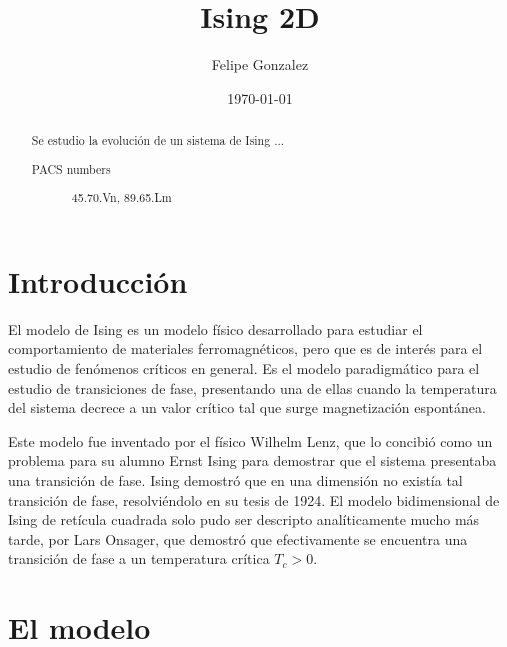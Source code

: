 \documentclass[%
 reprint,
 amsmath,amssymb,
 aps,
]{revtex4-1}
\begin{document}

\title{Ising 2D}

\author{Felipe Gonzalez}


\date{\today}

\begin{abstract}
Se estudio la evoluci\'on de un sistema de Ising ...


\begin{description}
\item[PACS numbers]
45.70.Vn, 89.65.Lm
\end{description}
\end{abstract}


\maketitle

\section{\label{intro}Introducci\'on}

El modelo de Ising es un modelo f\'isico desarrollado para estudiar el
comportamiento de materiales ferromagnéticos, pero que es de inter\'es para el
estudio de fen\'omenos cr\'iticos en general. Es el modelo paradigm\'atico para
el estudio de transiciones de fase, presentando una de ellas cuando la
temperatura del sistema decrece a un valor cr\'itico tal que surge
magnetizaci\'on espont\'anea.

Este modelo fue inventado por el f\'isico Wilhelm Lenz, que lo concibió
como un problema para su alumno Ernst Ising para demostrar que el sistema
presentaba una transici\'on de fase. Ising demostró que en una dimensión
no existía tal transici\'on de fase, resolviéndolo en su tesis de 1924. El modelo
bidimensional de Ising de retícula cuadrada solo pudo ser descripto
analíticamente mucho más tarde, por Lars Onsager, que demostró que
efectivamente se encuentra una transici\'on de fase a un temperatura cr\'itica
$T_c > 0$\cite{Onsager}.

\section{\label{theory}El modelo}
\end{document}
